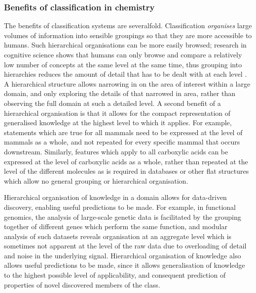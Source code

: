 \documentclass[10pt]{bmc_article}
\newenvironment{bmcformat}{\baselineskip20pt\sloppy\setboolean{publ}{false}}{\baselineskip20pt\sloppy}
\begin{document}
\begin{bmcformat}
\subsubsection*{Benefits of classification in chemistry}
The benefits of classification systems are severalfold. Classification \textit{organises} large volumes of information into sensible groupings so that they are more accessible to humans. Such hierarchical organisations can be more easily browsed; research in cognitive science shows that humans can only browse and compare a relatively low number of concepts at the same level at the same time, thus grouping into hierarchies reduces the amount of detail that has to be dealt with at each level \cite{sternberg2003}. A hierarchical structure allows narrowing in on the area of interest within a large domain, and only exploring the details of that narrowed in area, rather than observing the full domain at such a detailed level. A second benefit of a hierarchical organisation is that it allows for the compact representation of generalised knowledge at the highest level to which it applies.  For example, statements which are true for all mammals need to be expressed at the level of mammals as a whole, and not repeated for every specific mammal that occurs downstream.  Similarly, features which apply to all carboxylic acids can be expressed at the level of carboxylic acids as a whole, rather than repeated at the level of the different molecules as is required in databases or other flat structures which allow no general grouping or hierarchical organisation. 

Hierarchical organisation of knowledge in a domain allows for data-driven discovery, enabling useful predictions to be made.  For example, in functional genomics, the analysis of large-scale genetic data is facilitated by the grouping together of different genes which perform the same function, and modular analysis of such datasets reveals organisation at an aggregate level which is sometimes not apparent at the level of the raw data due to overloading of detail and noise in the underlying signal. %
Hierarchical organisation of knowledge also allows useful predictions to be made, since it allows generalisation of knowledge to the highest possible level of applicability, and consequent prediction of properties of novel discovered members of the class.  


\end{bmcformat}
\end{document}

